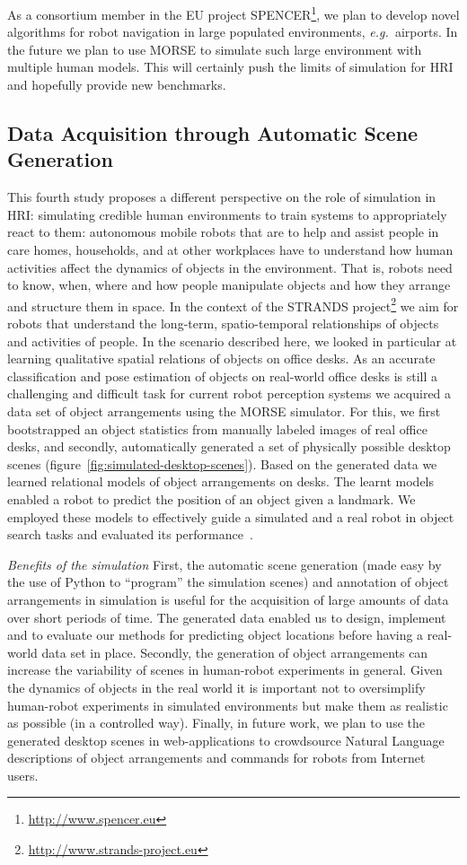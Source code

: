 \documentclass{llncs}
\newcommand{\eg}{{\textit{e.g.~}}}
\begin{document}
As a consortium member in the EU project
SPENCER\footnote{\url{http://www.spencer.eu}}, we plan to develop novel
algorithms for robot navigation in large populated environments, \eg airports.
In the future we plan to use MORSE to simulate such large environment with
multiple human models. This will certainly push the limits of simulation for HRI
and hopefully provide new benchmarks.

\subsection{Data Acquisition through Automatic Scene Generation}
\label{sc:generation}

This fourth study proposes a different perspective on the role of simulation in
HRI: simulating credible human environments to train systems to appropriately
react to them: autonomous mobile robots that are to help and assist people in
care homes, households, and at other workplaces have to understand how human
activities affect the dynamics of objects in the environment. That is, robots
need to know, when, where and how people manipulate objects and how they arrange
and structure them in space. In the context of the STRANDS
project\footnote{\url{http://www.strands-project.eu}} we aim for robots that
understand the long-term, spatio-temporal relationships of objects and
activities of people. In the scenario described here, we looked in
particular at learning qualitative spatial relations of objects on office desks.
As an accurate classification and pose estimation of objects on real-world
office desks is still a challenging and difficult task for current robot
perception systems we acquired a data set of object arrangements using the MORSE
simulator. For this, we first bootstrapped an object statistics from manually
labeled images of real office desks, and secondly, automatically generated a set
of physically possible desktop scenes
(figure~\ref{fig:simulated-desktop-scenes}). Based on the generated data we
learned relational models of object arrangements on desks. The learnt models
enabled a robot to predict the position of an object given a landmark. We
employed these models to effectively guide a simulated and a real robot in
object search tasks and evaluated its performance~\cite{kunze14indirect}.

\emph{Benefits of the simulation} First, the automatic scene generation (made
easy by the use of Python to ``program'' the simulation scenes) and annotation
of object arrangements in simulation is useful for the acquisition of large
amounts of data over short periods of time. The generated data enabled us to
design, implement and to evaluate our methods for predicting object locations
before having a real-world data set in place. Secondly, the generation of object
arrangements can increase the variability of scenes in human-robot experiments
in general. Given the dynamics of objects in the real world it is important not
to oversimplify human-robot experiments in simulated environments but make them
as realistic as possible (in a controlled way). Finally, in future work, we plan
to use the generated desktop scenes in web-applications to crowdsource Natural
Language descriptions of object arrangements and commands for robots from
Internet users.
\end{document}
